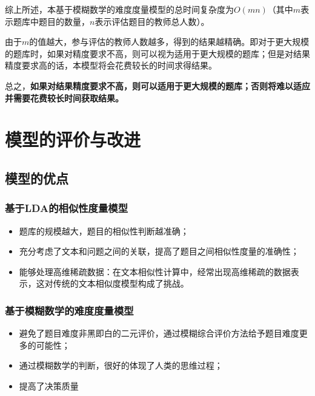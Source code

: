 综上所述，本基于模糊数学的难度度量模型的总时间复杂度为$O(mn)$（其中$m$表示题库中题目的数量，$n$表示评估题目的教师总人数）。

由于$m$的值越大，参与评估的教师人数越多，得到的结果越精确。即对于更大规模的题库时，如果对精度要求不高，则可以视为适用于更大规模的题库；但是对结果精度要求高的话，本模型将会花费较长的时间求得结果。

总之，\textbf{如果对结果精度要求不高，则可以适用于更大规模的题库；否则将难以适应并需要花费较长时间获取结果。}

%
%

\section{模型的评价与改进}

\subsection{模型的优点}

\subsubsection{基于LDA的相似性度量模型}

\begin{itemize}
    \item 题库的规模越大，题目的相似性判断越准确；
    \item 充分考虑了文本和问题之间的关联，提高了题目之间相似性度量的准确性；
    \item 能够处理高维稀疏数据：在文本相似性计算中，经常出现高维稀疏的数据表示，这对传统的文本相似度模型构成了挑战。
\end{itemize}

\subsubsection{基于模糊数学的难度度量模型}

\begin{itemize}
    \item 避免了题目难度非黑即白的二元评价，通过模糊综合评价方法给予题目难度更多的可能性；
    \item 通过模糊数学的判断，很好的体现了人类的思维过程；
    \item 提高了决策质量
\end{itemize}

